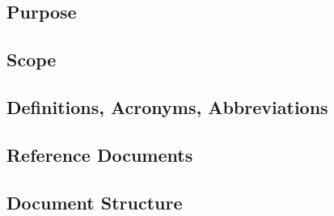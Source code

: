 \subsection{Purpose}
\label{sect:introduction:purpose}


\subsection{Scope}
\label{sect:introduction:scope}


\subsection{Definitions, Acronyms, Abbreviations}
\label{sect:introduction:description}


\subsection{Reference Documents}
\label{sect:introduction:refdocs}


\subsection{Document Structure}
\label{sect:introduction:docstructure}
